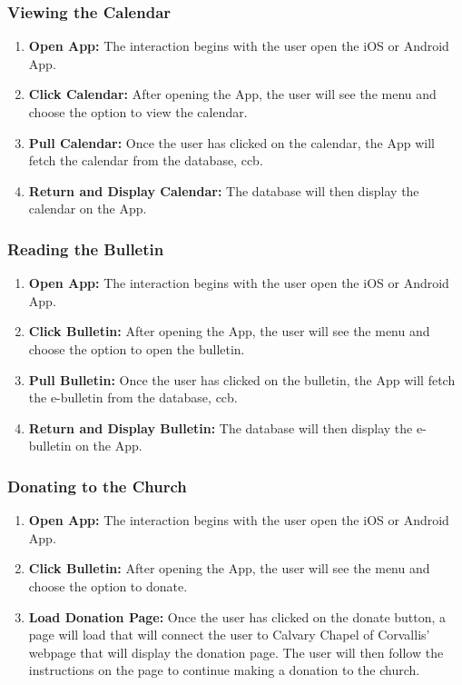 \documentclass[letterpaper,10pt,draftclsnofoot,onecolumn,titlepage]{IEEEtran}
\begin{document}
			\subsubsection{Viewing the Calendar}
				\begin{enumerate}
					\item \textbf{Open \Gls{App}:} The interaction begins with the user open the \gls{iOS} or \gls{Android} \gls{App}.
					\item \textbf{Click Calendar:} After opening the \gls{App}, the user will see the menu and choose the option to view the calendar.
					\item \textbf{Pull Calendar:} Once the user has clicked on the calendar, the \gls{App} will fetch the calendar from the database, \gls{ccb}.
					\item \textbf{Return and Display Calendar:} The database will then display the calendar on the \gls{App}.
				\end{enumerate}

			\subsubsection{Reading the Bulletin}
				\begin{enumerate}
					\item \textbf{Open \Gls{App}:} The interaction begins with the user open the \gls{iOS} or \gls{Android} \gls{App}.
					\item \textbf{Click Bulletin:} After opening the \gls{App}, the user will see the menu and choose the option to open the bulletin.
					\item \textbf{Pull Bulletin:} Once the user has clicked on the bulletin, the \gls{App} will fetch the e-bulletin from the database, \gls{ccb}.
					\item \textbf{Return and Display Bulletin:} The database will then display the e-bulletin on the \gls{App}.
				\end{enumerate}

			\subsubsection{Donating to the Church}
				\begin{enumerate}
					\item \textbf{Open \Gls{App}:} The interaction begins with the user open the \gls{iOS} or \gls{Android} \gls{App}.
					\item \textbf{Click Bulletin:} After opening the \gls{App}, the user will see the menu and choose the option to donate.
					\item \textbf{Load Donation Page:} Once the user has clicked on the donate button, a page will load that will connect the user to Calvary Chapel of Corvallis' webpage that will display the donation page.
					The user will then follow the instructions on the page to continue making a donation to the church.
				\end{enumerate}
\end{document}
